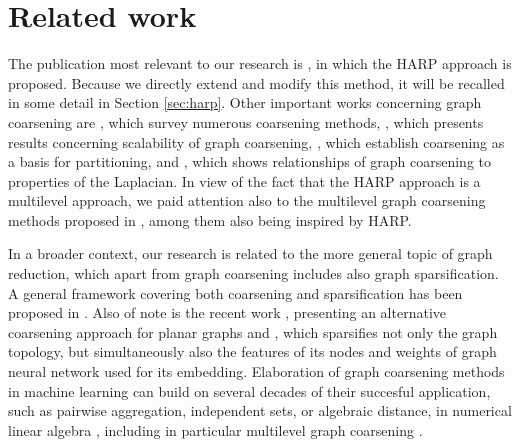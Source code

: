 \section{Related work}

The publication most relevant to our research is \cite{chen_harp_2018}, in which the HARP approach is proposed. Because we directly extend and modify this method, it will be recalled in some detail in Section \ref{sec:harp}. Other important works concerning graph coarsening are \cite{akyildiz_understanding_2020,cai_graph_2022,chen_graph_2022}, which survey numerous coarsening methods, \cite{huang_scaling_2021}, which presents results concerning scalability of graph coarsening, \cite{catalyurek_multithreaded_2012,herrmann_multilevel_2019}, which establish coarsening as a basis for partitioning, and \cite{loukas_graph_2019}, which shows relationships of graph coarsening to properties of the Laplacian. In view of the fact that the HARP approach is a multilevel approach, we paid attention also to the multilevel graph coarsening methods proposed in \cite{bethune_hierarchical_2020,liu_hierarchical_2021,xie_graph_2020,zhang_harp_2021}, among them \cite{zhang_harp_2021} also being inspired by HARP.

In a broader context, our research is related to the more general topic of graph reduction, which apart from graph coarsening includes also graph sparsification. A general framework covering both coarsening and sparsification has been proposed in \cite{bravo_hermsdorff_unifying_2019}. Also of note is the recent work \cite{kammer_space-efficient_2022}, presenting an alternative coarsening approach for planar graphs and \cite{liu_comprehensive_2022}, which sparsifies not only the graph topology, but simultaneously also the features of its nodes and weights of graph neural network used for its embedding. Elaboration of graph coarsening methods in machine learning can build on several decades of their succesful application, such as pairwise aggregation, independent sets, or algebraic distance, in numerical linear algebra \cite{chen_graph_2022}, including in particular multilevel graph coarsening \cite{osei-kuffuor_matrix_2015,ubaru_sampling_2019}.
